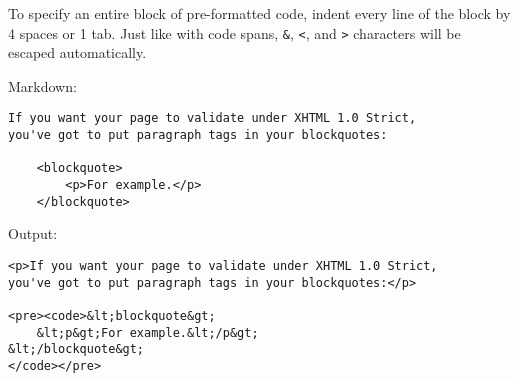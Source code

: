 To specify an entire block of pre-formatted code, indent every line of
the block by 4 spaces or 1 tab. Just like with code spans, \texttt{\&}, \texttt{<},
and \texttt{>} characters will be escaped automatically.



Markdown:

\begin{lstlisting}
If you want your page to validate under XHTML 1.0 Strict,
you've got to put paragraph tags in your blockquotes:

    <blockquote>
        <p>For example.</p>
    </blockquote>
\end{lstlisting}




Output:

\begin{lstlisting}
<p>If you want your page to validate under XHTML 1.0 Strict,
you've got to put paragraph tags in your blockquotes:</p>

<pre><code>&lt;blockquote&gt;
    &lt;p&gt;For example.&lt;/p&gt;
&lt;/blockquote&gt;
</code></pre>
\end{lstlisting}

